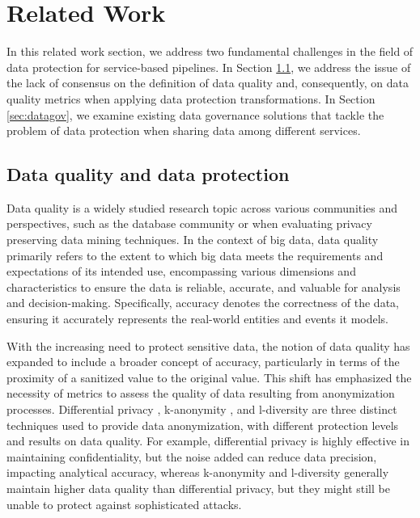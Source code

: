 \section{Related Work}\label{sec:related}


In this related work section, we address two fundamental challenges in the field of data protection for service-based pipelines. 
In Section  \ref{sec:dataquality}, we address the issue of the lack of consensus on the definition of data quality and, consequently, on data quality metrics when applying data protection transformations. In Section \ref{sec:datagov}, we examine existing data governance solutions that tackle the problem of data protection when sharing data among different services.

\subsection{Data quality and data protection}\label{sec:dataquality}

Data quality is a widely studied research topic across various communities and perspectives, such as the database community or when evaluating privacy preserving data mining techniques. In the context of big data, data quality primarily refers to the extent to which big data meets the requirements and expectations of its intended use, encompassing various dimensions and characteristics to ensure the data is reliable, accurate, and valuable for analysis and decision-making. Specifically, accuracy denotes the correctness of the data, ensuring it accurately represents the real-world entities and events it models.

With the increasing need to protect sensitive data, the notion of data quality has expanded to include a broader concept of accuracy, particularly in terms of the proximity of a sanitized value to the original value.
This shift has emphasized the necessity of metrics to assess the quality of data resulting from anonymization processes. 
Differential privacy \cite{dwork2008differential}, k-anonymity \cite{k-anon}, and l-diversity \cite{l-diversity} are three distinct techniques used to provide data anonymization, with different protection levels and results on data quality. For example, differential privacy is highly effective in maintaining confidentiality, but the noise added can reduce data precision, impacting analytical accuracy, whereas k-anonymity and l-diversity generally maintain higher data quality than differential privacy, but they might still be unable to protect against sophisticated attacks.


